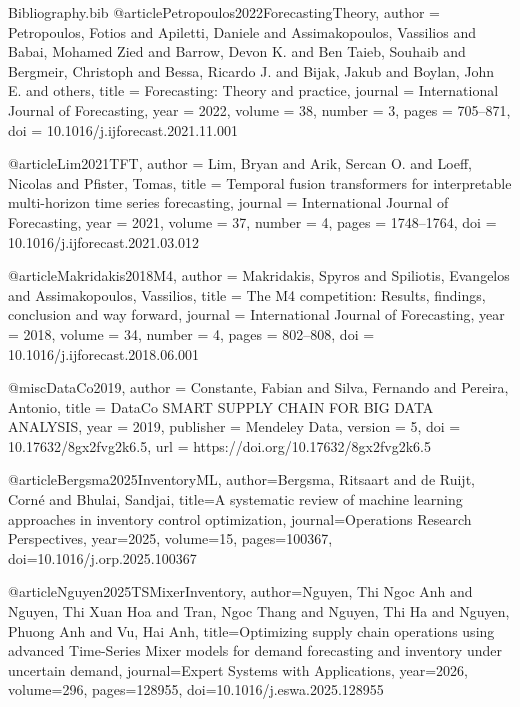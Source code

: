 \begin{filecontents*}{Bibliography.bib}
@article{Petropoulos2022ForecastingTheory,
  author  = {Petropoulos, Fotios and Apiletti, Daniele and Assimakopoulos, Vassilios and Babai, Mohamed Zied and Barrow, Devon K. and Ben Taieb, Souhaib and Bergmeir, Christoph and Bessa, Ricardo J. and Bijak, Jakub and Boylan, John E. and others},
  title   = {Forecasting: Theory and practice},
  journal = {International Journal of Forecasting},
  year    = {2022},
  volume  = {38},
  number  = {3},
  pages   = {705--871},
  doi     = {10.1016/j.ijforecast.2021.11.001}
}

@article{Lim2021TFT,
  author  = {Lim, Bryan and Arik, Sercan O. and Loeff, Nicolas and Pfister, Tomas},
  title   = {Temporal fusion transformers for interpretable multi-horizon time series forecasting},
  journal = {International Journal of Forecasting},
  year    = {2021},
  volume  = {37},
  number  = {4},
  pages   = {1748--1764},
  doi     = {10.1016/j.ijforecast.2021.03.012}
}

@article{Makridakis2018M4,
  author  = {Makridakis, Spyros and Spiliotis, Evangelos and Assimakopoulos, Vassilios},
  title   = {The M4 competition: Results, findings, conclusion and way forward},
  journal = {International Journal of Forecasting},
  year    = {2018},
  volume  = {34},
  number  = {4},
  pages   = {802--808},
  doi     = {10.1016/j.ijforecast.2018.06.001}
}

@misc{DataCo2019,
  author       = {Constante, Fabian and Silva, Fernando and Pereira, Antonio},
  title        = {DataCo SMART SUPPLY CHAIN FOR BIG DATA ANALYSIS},
  year         = {2019},
  publisher    = {Mendeley Data},
  version      = {5},
  doi          = {10.17632/8gx2fvg2k6.5},
  url          = {https://doi.org/10.17632/8gx2fvg2k6.5}
}

@article{Bergsma2025InventoryML,
 author={Bergsma, Ritsaart and de Ruijt, Corné and Bhulai, Sandjai}, title={A systematic review of machine learning approaches in inventory control optimization}, journal={Operations Research Perspectives}, year={2025}, volume={15}, pages={100367}, doi={10.1016/j.orp.2025.100367}}

@article{Nguyen2025TSMixerInventory,
 author={Nguyen, Thi Ngoc Anh and Nguyen, Thi Xuan Hoa and Tran, Ngoc Thang and Nguyen, Thi Ha and Nguyen, Phuong Anh and Vu, Hai Anh}, title={Optimizing supply chain operations using advanced Time-Series Mixer models for demand forecasting and inventory under uncertain demand}, journal={Expert Systems with Applications}, year={2026}, volume={296}, pages={128955}, doi={10.1016/j.eswa.2025.128955}}


\end{filecontents*}
